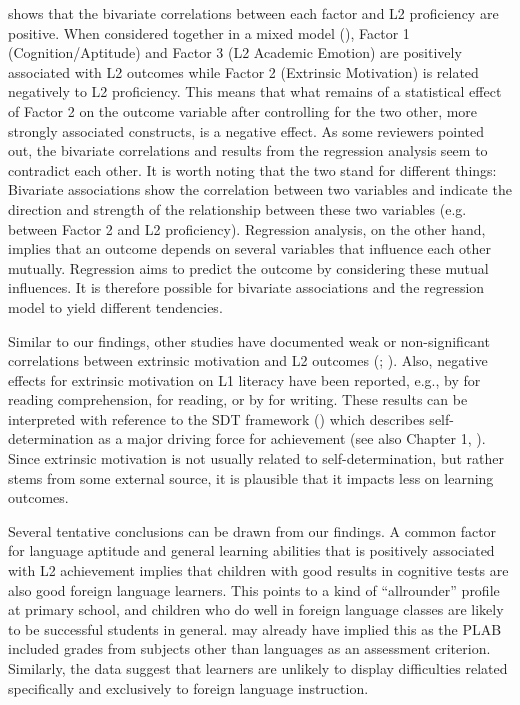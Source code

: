 \documentclass[output=paper]{langsci/langscibook}
\begin{document}
 shows that the bivariate correlations between each factor and L2 proficiency are positive. When considered together in a mixed model (), Factor 1 (Cognition/Aptitude) and Factor 3 (L2 Academic Emotion) are positively associated with L2 outcomes while Factor 2 (Extrinsic Motivation) is related negatively to L2 proficiency. This means that what remains of a statistical effect of Factor 2 on the outcome variable after controlling for the two other, more strongly associated constructs, is a negative effect. As some reviewers pointed out, the bivariate correlations and results from the regression analysis seem to contradict each other. It is worth noting that the two stand for different things: Bivariate associations show the correlation between two variables and indicate the direction and strength of the relationship between these two variables (e.g. between Factor 2 and L2 proficiency). Regression analysis, on the other hand, implies that an outcome depends on several variables that influence each other mutually. Regression aims to predict the outcome by considering these mutual influences. It is therefore possible for bivariate associations and the regression model to yield different tendencies.

Similar to our findings, other studies have documented weak or non-significant correlations between extrinsic motivation and L2 outcomes (\citealt[18]{HusfeldtLehmann2009}; \citealt[31]{KreisEtAl2014}). Also, negative effects for extrinsic motivation on L1 literacy have been reported, e.g., by \citet{WangGuthrie2004} for reading comprehension, \citet{BeckerEtAl2010} for reading, or by \citet{PajaresEtAl2009} for writing. These results can be interpreted with reference to the SDT framework (\citealt{DeciRyan2002}) which describes self-determination as a major driving force for achievement (see also Chapter 1, ). Since extrinsic motivation is not usually related to self-determination, but rather stems from some external source, it is plausible that it impacts less on learning outcomes.

Several tentative conclusions can be drawn from our findings. A common factor for language aptitude and general learning abilities that is positively associated with L2 achievement implies that children with good results in cognitive tests are also good foreign language learners. This points to a kind of “allrounder” profile at primary school, and children who do well in foreign language classes are likely to be successful students in general. \citet{Pimsleur1966} may already have implied this as the PLAB included grades from subjects other than languages as an assessment criterion. Similarly, the data suggest that learners are unlikely to display difficulties related specifically and exclusively to foreign language instruction.
\end{document}
